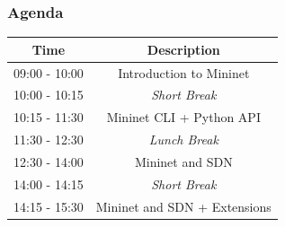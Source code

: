 \documentclass{beamer}
\begin{document}
\begin{frame}
  \frametitle{Agenda}

  \centering
  \begin{tabular}{cc}
    \hline
    \rowcolor{LightBlue}
    Time & \multicolumn{1}{c}{Description}\\ \hline
    09:00 - 10:00 & Introduction to Mininet \\ \hline
    10:00 - 10:15 & \textit{Short Break} \\ \hline
    10:15 - 11:30 & Mininet CLI + Python API \\ \hline
    11:30 - 12:30 & \textit{Lunch Break} \\ \hline
    12:30 - 14:00 & Mininet and SDN \\ \hline
    14:00 - 14:15 & \textit{Short Break} \\ \hline
    14:15 - 15:30 & Mininet and SDN + Extensions \\ \hline
  \end{tabular}

\end{frame}
\end{document}
